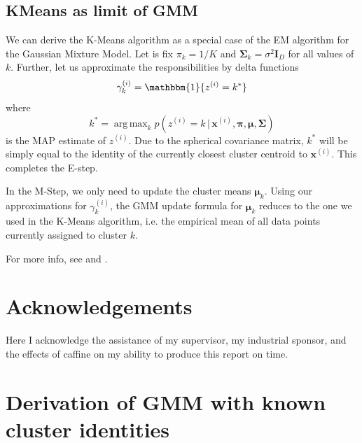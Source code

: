 \documentclass[final,3p,times,twocolumn]{elsarticle}
\DeclareMathOperator*{\argmax}{arg\,max}
\begin{document}
\subsection{KMeans as limit of GMM}
We can derive the K-Means algorithm as a special case of the EM algorithm for the Gaussian Mixture Model.
Let is fix $\pi_k = 1/K$ and $\boldsymbol \Sigma_k = \sigma^2 \boldsymbol I_D$ for all values of $k$.
Further, let us approximate the responsibilities by delta functions
\begin{equation}
\label{eqn:gmmdelta}
\gamma_k^{(i)} = \mathbbm{1}\{z^{(i)} = k^*\}
\end{equation}
where
\begin{equation}
k^* = \argmax_k p(z^{(i)} = k\,|\,\boldsymbol x^{(i)},\boldsymbol \pi, \boldsymbol \mu, \boldsymbol \Sigma)
\end{equation}
is the MAP estimate of $z^{(i)}$.
Due to the spherical covariance matrix, $k^*$ will be simply equal to the identity of the currently closest cluster centroid to $\boldsymbol x^{(i)}$. This completes the E-step.

In the M-Step, we only need to update the cluster means $\boldsymbol \mu_k$.
Using our approximations for $\gamma_k^{(i)}$, the GMM update formula for $\boldsymbol \mu_k$ reduces to the one we used in the K-Means algorithm, i.e. the empirical mean of all data points currently assigned to cluster $k$.

For more info, see \cite{Bishop} and \cite{Murphy}.


\section*{Acknowledgements}
Here I acknowledge the assistance of my supervisor, my industrial sponsor,
and the effects of caffine on my ability to produce this report on time.

\appendix

\section{Derivation of GMM with known cluster identities}
\label{app:gmm}

\end{document}
